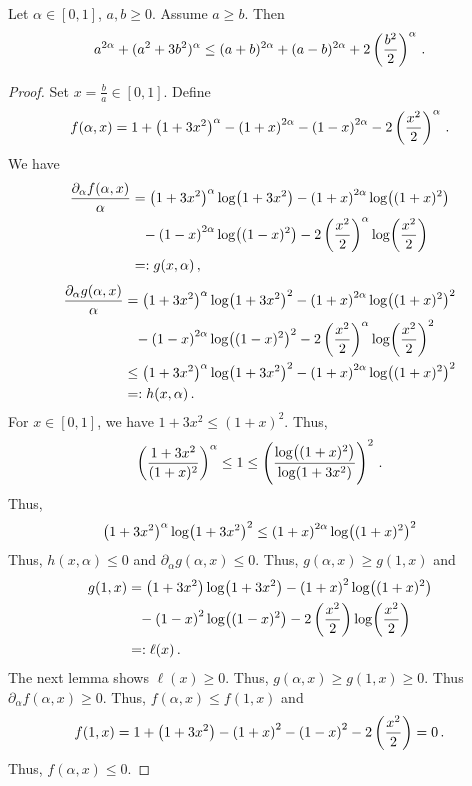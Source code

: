 %
\begin{lemma}
	Let $\alpha\in[0, 1]$, $a,b\geq0$. Assume $a\geq b$.
	Then
	\begin{equation*}
		a^{2\alpha}+(a^2  + 3 b^2)^\alpha \leq (a+b)^{2\alpha} + (a-b)^{2\alpha} + 2\left( \frac{b^2}{2} \right)^{\alpha}
		\, .
	\end{equation*}
\end{lemma}
%
\begin{proof}
	Set $x =\frac{b}{a} \in [0,1]$. Define
	\begin{equation*}
		f(\alpha,x) = 1+\left( 1+3x^2 \right)^\alpha-\left( 1+x \right)^{2\alpha}-\left( 1-x \right)^{2\alpha}-2\left( \frac{x^2}2 \right)^\alpha
		\, .
	\end{equation*}
	We have
	\begin{align*}
		\frac{\partial_\alpha f(\alpha, x)}{\alpha} &= \left( 1+3x^2 \right)^\alpha \log\!\left( 1+3x^2 \right)-\left( 1+x \right)^{2\alpha}\log\!\left( (1+x)^2 \right)
		\\&\hphantom{=}
		-\left( 1-x \right)^{2\alpha}\log\!\left( (1-x)^2 \right)-2\left( \frac{x^2}2 \right)^\alpha\log\!\left( \frac{x^2}2 \right)
		\\&=:g(x,\alpha)\, ,
	\end{align*}
	\begin{align*}
		\frac{\partial_\alpha g(\alpha, x)}{\alpha} &=
		\left( 1+3x^2 \right)^\alpha \log\!\left( 1+3x^2 \right)^2-\left( 1+x \right)^{2\alpha}\log\!\left( (1+x)^2 \right)^2
		\\&\hphantom{=}
		-\left( 1-x \right)^{2\alpha}\log\!\left( (1-x)^2 \right)^2-2\left( \frac{x^2}2 \right)^\alpha\log\!\left( \frac{x^2}2 \right)^2
		\\&\leq
		\left( 1+3x^2 \right)^\alpha \log\!\left( 1+3x^2 \right)^2-\left( 1+x \right)^{2\alpha}\log\!\left( (1+x)^2 \right)^2
		\\&=:h(x,\alpha)
		\, .
	\end{align*}
	For $x\in[0,1]$, we have $1+3x^2 \leq (1+x)^2$. Thus,
	\begin{equation*}
		\left( \frac{1+3x^2}{(1+x)^2} \right)^\alpha \leq 1 \leq \left( \frac{\log\!\left( (1+x)^2 \right)}{\log\!\left( 1+3x^2 \right)} \right)^2
		\, .
	\end{equation*}
	Thus,
	\begin{equation*}
		\left( 1+3x^2 \right)^\alpha \log\!\left( 1+3x^2 \right)^2 \leq \left( 1+x \right)^{2\alpha}\log\!\left( (1+x)^2 \right)^2
	\end{equation*}
	Thus, $h(x,\alpha) \leq 0$ and $\partial_\alpha g(\alpha,x) \leq 0$. Thus, $g(\alpha,x) \geq g(1,x)$ and
	\begin{align*}
		g(1,x) &= 
		\left( 1+3x^2 \right) \log\!\left( 1+3x^2 \right)-\left( 1+x \right)^{2}\log\!\left( (1+x)^2 \right)
		\\&\hphantom{=}
		-\left( 1-x \right)^{2}\log\!\left( (1-x)^2 \right)-2\left( \frac{x^2}2 \right)\log\!\left( \frac{x^2}2 \right)
		\\&=:\ell(x)
		\, .
	\end{align*}
	The next lemma shows $\ell(x) \geq 0$.
	Thus, $g(\alpha,x) \geq g(1,x) \geq 0$. Thus $\partial_\alpha f(\alpha,x) \geq 0$. Thus, $f(\alpha,x) \leq f(1,x)$ and
	\begin{equation*}
		f(1,x) = 1+\left( 1+3x^2 \right)-\left( 1+x \right)^{2}-\left( 1-x \right)^{2}-2\left( \frac{x^2}2 \right) = 0
		\, .
	\end{equation*}
	Thus, $f(\alpha, x) \leq 0$.
\end{proof}
